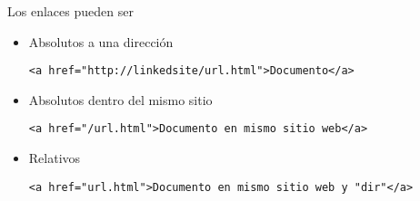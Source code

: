 \documentclass[ucs]{beamer}
\begin{document}
\begin{frame}[fragile]
\frametitle{}
Los enlaces pueden ser 


\begin{itemize}
\item
Absolutos a una dirección
  \begin{footnotesize}
  \begin{verbatim}
<a href="http://linkedsite/url.html">Documento</a>
  \end{verbatim}
  \end{footnotesize}

\item
Absolutos dentro del mismo sitio 
  \begin{footnotesize}
  \begin{verbatim}
<a href="/url.html">Documento en mismo sitio web</a>
  \end{verbatim}
  \end{footnotesize}

\item
Relativos 
  \begin{footnotesize}
  \begin{verbatim}
<a href="url.html">Documento en mismo sitio web y "dir"</a>
  \end{verbatim}
  \end{footnotesize}
\end{itemize}

\end{frame}
\end{document}
